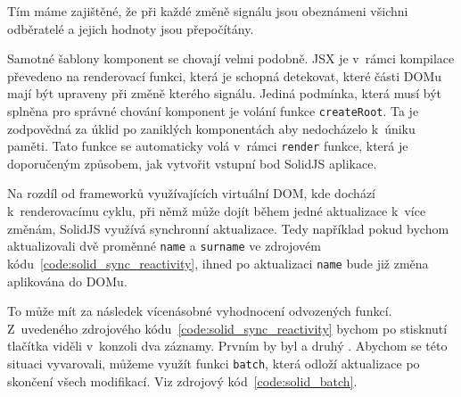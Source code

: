 \documentclass[
  master,
  program=ainf,
  tables=false,
  sourcecodes,
  glossaries,
  index
]{kidiplom}
\begin{document}
Tím máme zajištěné, že při každé změně signálu jsou obeznámeni všichni odběratelé a jejich hodnoty jsou
přepočítány.

Samotné šablony komponent se chovají velmi podobně. JSX je v~rámci kompilace převedeno na renderovací
funkci, která je schopná detekovat, které části DOMu mají být upraveny při změně kterého signálu.
Jediná podmínka, která musí být splněna pro správné chování komponent je volání funkce {\tt createRoot}. 
Ta je zodpovědná za úklid po zaniklých komponentách aby nedocházelo k~úniku paměti. Tato funkce se 
automaticky volá v~rámci {\tt render} funkce, která je doporučeným způsobem, jak vytvořit vstupní bod
SolidJS \cite{solidjs} aplikace.

Na rozdíl od frameworků využívajících virtuální DOM, kde dochází k~renderovacímu cyklu, při němž 
může dojít během jedné aktualizace k~více změnám, SolidJS \cite{solidjs} využívá synchronní aktualizace. Tedy například
pokud bychom aktualizovali dvě proměnné {\tt name} a {\tt surname} ve zdrojovém kódu~\ref{code:solid_sync_reactivity},
ihned po aktualizaci {\tt name} bude již změna aplikována do DOMu.

\begin{absolutelynopagebreak}
\end{absolutelynopagebreak}

To může mít za následek vícenásobné vyhodnocení odvozených funkcí. Z~uvedeného zdrojového kódu~\ref{code:solid_sync_reactivity} bychom po
stisknutí tlačítka viděli v~konzoli dva záznamy. Prvním by byl  a druhý .
Abychom se této situaci vyvarovali, můžeme využít funkci {\tt batch}, která odloží aktualizace po skončení
všech modifikací. Viz zdrojový kód~\ref{code:solid_batch}.
\end{document}
